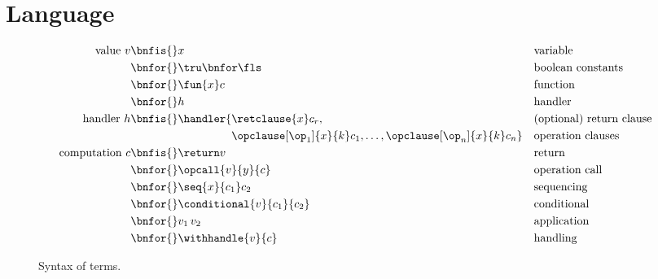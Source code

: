 \section{Language}
\label{sec:language}

\begin{figure}
\small
\hrulefill
\begin{align*}
  \text{value}~v
    \bnfis {} &x & & \text{variable} \\
    \bnfor {} &\tru \bnfor \fls & & \text{boolean constants} \\
    \bnfor {} &\fun{x} c & & \text{function} \\
    \bnfor {} &h & & \text{handler} \\
  \text{handler}~h
    \bnfis {} &\handler \{
      \retclause{x} c_r, & & \text{(optional) return clause} \\
      &\hphantom{\handler \{ {}}
      \opclause[\op_1]{x}{k} c_1,
      \dots,
      \opclause[\op_n]{x}{k} c_n \} & & \text{operation clauses} \\
  \text{computation}~c
    \bnfis {} &\return v & & \text{return} \\
    \bnfor {} &\opcall{v}{y}{c} & & \text{operation call} \\
    \bnfor {} &\seq{x}{c_1} c_2 & & \text{sequencing} \\
    \bnfor {} &\conditional{v}{c_1}{c_2} & & \text{conditional} \\
    \bnfor {} &v_1 \, v_2 & & \text{application} \\
    \bnfor {} &\withhandle{v}{c} & & \text{handling}
\end{align*}
\hrulefill
\caption{Syntax of terms.}
\label{fig:terms}  
\end{figure}

